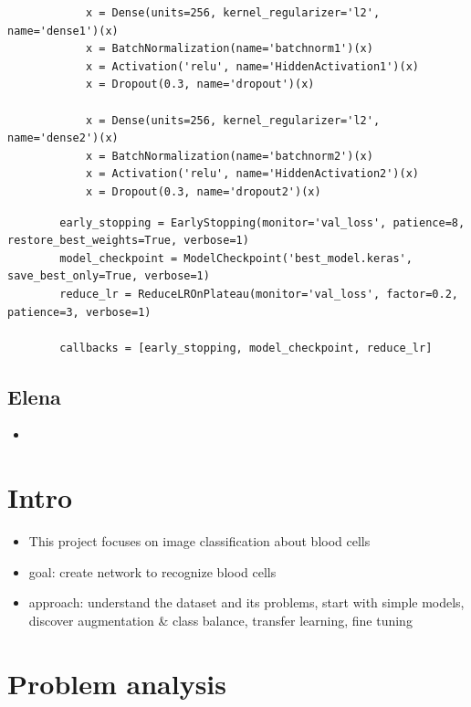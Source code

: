 \documentclass[11pt]{article}
\begin{document}
\begin{multicols*}{2}
\begin{itemize}
\begin{lstlisting}
            x = Dense(units=256, kernel_regularizer='l2', name='dense1')(x)
            x = BatchNormalization(name='batchnorm1')(x)
            x = Activation('relu', name='HiddenActivation1')(x)
            x = Dropout(0.3, name='dropout')(x)

            x = Dense(units=256, kernel_regularizer='l2', name='dense2')(x)
            x = BatchNormalization(name='batchnorm2')(x)
            x = Activation('relu', name='HiddenActivation2')(x)
            x = Dropout(0.3, name='dropout2')(x)
            \end{lstlisting}
        \end{itemize}
        \begin{lstlisting}
        early_stopping = EarlyStopping(monitor='val_loss', patience=8, restore_best_weights=True, verbose=1)
        model_checkpoint = ModelCheckpoint('best_model.keras', save_best_only=True, verbose=1)
        reduce_lr = ReduceLROnPlateau(monitor='val_loss', factor=0.2, patience=3, verbose=1)
        
        callbacks = [early_stopping, model_checkpoint, reduce_lr]
        \end{lstlisting}

        \subsection{Elena}

        \begin{itemize}
            \item 
        \end{itemize}

        \newpage

        \section{Intro}
    
        \begin{itemize}
            \item This project focuses on image classification about blood cells
            \item goal: create network to recognize blood cells
            \item approach: understand the dataset and its problems, start with simple models, discover augmentation \& class balance, transfer learning, fine tuning
        \end{itemize}
    
        \section{Problem analysis} 
    

\end{multicols*}
\end{document}
